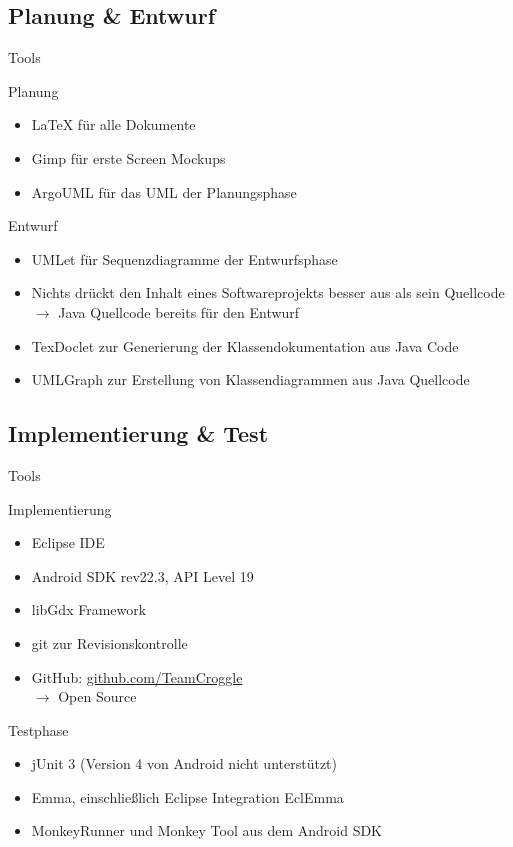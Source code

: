 \documentclass[18pt]{beamer}
\begin{document}
	\subsection{Planung \& Entwurf}
	\begin{frame}[<+->]{Tools}
		\begin{block}{Planung}
			\begin{itemize}
				\item LaTeX für alle Dokumente
				\item Gimp für erste Screen Mockups
				\item ArgoUML für das UML der Planungsphase
			\end{itemize}
		\end{block}
		\begin{block}{Entwurf}
			\begin{itemize}
				\item UMLet für Sequenzdiagramme der Entwurfsphase
				\item Nichts drückt den Inhalt eines Softwareprojekts besser aus als sein Quellcode \\
				$\rightarrow$ Java Quellcode bereits für den Entwurf
				\item TexDoclet zur Generierung der Klassendokumentation aus Java Code
				\item UMLGraph zur Erstellung von Klassendiagrammen aus Java Quellcode
			\end{itemize}
		\end{block}
	\end{frame}

	\subsection{Implementierung \& Test}
	\begin{frame}[<+->]{Tools}
		\begin{block}{Implementierung}
			\begin{itemize}
				\item Eclipse IDE
				\item Android SDK rev22.3, API Level 19
				\item libGdx Framework
				\item git zur Revisionskontrolle
				\item GitHub: \textcolor{blue}{\href{http://github.com/TeamCroggle}{github.com/TeamCroggle}} \\
					$\rightarrow$ Open Source
			\end{itemize}
		\end{block}
		\begin{block}{Testphase}
			\begin{itemize}
				\item jUnit 3 (Version 4 von Android nicht unterstützt)
				\item Emma, einschließlich Eclipse Integration EclEmma
				\item MonkeyRunner und Monkey Tool aus dem Android SDK
			\end{itemize}
		\end{block}
	\end{frame}
	
\end{document}
